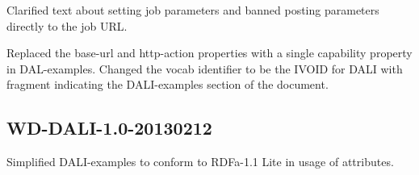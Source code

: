 \documentclass[11pt,letter]{ivoa}
\begin{document}
Clarified text about setting job parameters and banned posting parameters
directly to the job URL.

Replaced the base-url and http-action properties with a single capability
property in DAL-examples. Changed the vocab identifier to be the IVOID for DALI
with fragment indicating the DALI-examples section of the document.

\subsection{WD-DALI-1.0-20130212}
Simplified DALI-examples to conform to RDFa-1.1 Lite in usage of attributes.


\end{document}
